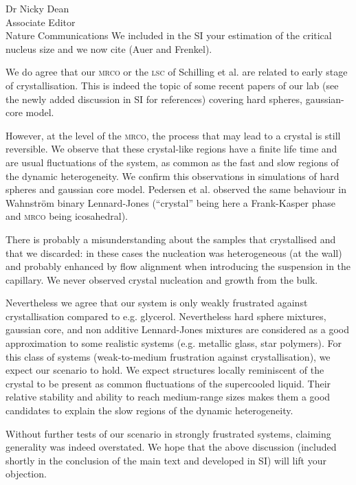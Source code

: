 \documentclass[a4paper, rebuttal, parskip=true, firsthead=false, fromemail=true, foldmarks=false]{scrlttr2}
\begin{document}
\begin{letter}{Dr Nicky Dean\\
Associate Editor\\
Nature Communications}
We included in the SI your estimation of the critical nucleus size and we now cite (Auer and Frenkel).

We do agree that our \textsc{mrco} or the \textsc{lsc} of Schilling et al. are related to early stage of crystallisation. This is indeed the topic of some recent papers of our lab (see the newly added discussion in SI for references) covering hard spheres, gaussian-core model. 

However, at the level of the \textsc{mrco}, the process that may lead to a crystal is still reversible. We observe that these crystal-like regions have a finite life time and are usual fluctuations of the system, as common as the fast and slow regions of the dynamic heterogeneity. We confirm this observations in simulations of hard spheres and gaussian core model. Pedersen et al. observed the same behaviour in Wahnstr\"om binary Lennard-Jones (``crystal'' being here a Frank-Kasper phase and \textsc{mrco} being icosahedral).

There is probably a misunderstanding about the samples that crystallised and that we discarded: in these cases the nucleation was heterogeneous (at the wall) and probably enhanced by flow alignment when introducing the suspension in the capillary. We never observed crystal nucleation and growth from the bulk.

Nevertheless we agree that our system is only weakly frustrated against crystallisation compared to e.g. glycerol. Nevertheless hard sphere mixtures, gaussian core, and non additive Lennard-Jones mixtures are considered as a good approximation to some realistic systems (e.g. metallic glass, star polymers). For this class of systems (weak-to-medium frustration against crystallisation), we expect our scenario to hold. We expect structures locally reminiscent of the crystal to be present as common fluctuations of the supercooled liquid. Their relative stability and ability to reach medium-range sizes makes them a good candidates to explain the slow regions of the dynamic heterogeneity.

Without further tests of our scenario in strongly frustrated systems, claiming generality was indeed overstated. We hope that the above discussion (included shortly in the conclusion of the main text and developed in SI) will lift your objection.



\end{letter}
\end{document}
